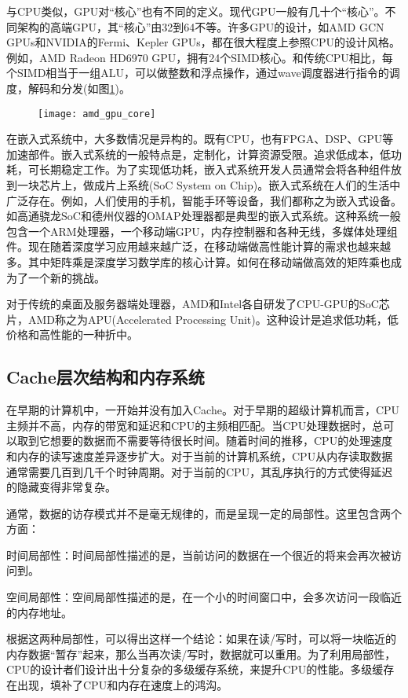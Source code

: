 与CPU类似，GPU对“核心”也有不同的定义。现代GPU一般有几十个“核心”。不同架构的高端GPU，其“核心”由32到64不等。许多GPU的设计，如AMD GCN GPUs和NVIDIA的Fermi、Kepler GPUs，都在很大程度上参照CPU的设计风格。例如，AMD Radeon HD6970 GPU，拥有24个SIMD核心。和传统CPU相比，每个SIMD相当于一组ALU，可以做整数和浮点操作，通过wave调度器进行指令的调度，解码和分发(如图\ref{fig:amd_gpu_core})。
\begin{figure}[htbp]
	\centering
	\texttt{[image: amd\_gpu\_core]}
	\label{fig:amd_gpu_core}
\end{figure}

在嵌入式系统中，大多数情况是异构的。既有CPU，也有FPGA、DSP、GPU等加速部件。嵌入式系统的一般特点是，定制化，计算资源受限。追求低成本，低功耗，可长期稳定工作。为了实现低功耗，嵌入式系统开发人员通常会将各种组件放到一块芯片上，做成片上系统(SoC System on Chip)。嵌入式系统在人们的生活中广泛存在。例如，人们使用的手机，智能手环等设备，我们都称之为嵌入式设备。如高通骁龙SoC和德州仪器的OMAP处理器都是典型的嵌入式系统。这种系统一般包含一个ARM处理器，一个移动端GPU，内存控制器和各种无线，多媒体处理组件。现在随着深度学习应用越来越广泛，在移动端做高性能计算的需求也越来越多。其中矩阵乘是深度学习数学库的核心计算。如何在移动端做高效的矩阵乘也成为了一个新的挑战。

对于传统的桌面及服务器端处理器，AMD和Intel各自研发了CPU-GPU的SoC芯片，AMD称之为APU(Accelerated Processing Unit)。这种设计是追求低功耗，低价格和高性能的一种折中。

\subsection{Cache层次结构和内存系统}
在早期的计算机中，一开始并没有加入Cache。对于早期的超级计算机而言，CPU主频并不高，内存的带宽和延迟和CPU的主频相匹配。当CPU处理数据时，总可以取到它想要的数据而不需要等待很长时间。随着时间的推移，CPU的处理速度和内存的读写速度差异逐步扩大。对于当前的计算机系统，CPU从内存读取数据通常需要几百到几千个时钟周期。对于当前的CPU，其乱序执行的方式使得延迟的隐藏变得非常复杂。

通常，数据的访存模式并不是毫无规律的，而是呈现一定的局部性。这里包含两个方面：

时间局部性：时间局部性描述的是，当前访问的数据在一个很近的将来会再次被访问到。

空间局部性：空间局部性描述的是，在一个小的时间窗口中，会多次访问一段临近的内存地址。

根据这两种局部性，可以得出这样一个结论：如果在读/写时，可以将一块临近的内存数据“暂存”起来，那么当再次读/写时，数据就可以重用。为了利用局部性，CPU的设计者们设计出十分复杂的多级缓存系统，来提升CPU的性能。多级缓存在出现，填补了CPU和内存在速度上的鸿沟。

